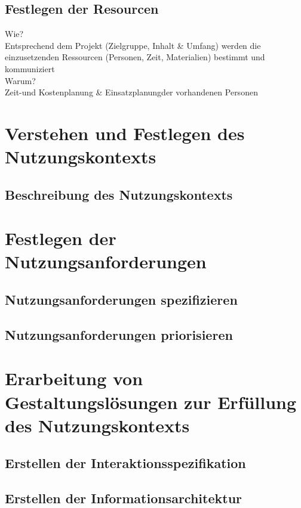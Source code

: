 \documentclass[12pt, a4paper]{scrartcl}
\begin{document}
	\subsection{Festlegen der Resourcen}
	Wie?\\
	Entsprechend dem Projekt (Zielgruppe, Inhalt \& Umfang) werden die einzusetzenden Ressourcen (Personen, Zeit, Materialien) bestimmt und kommuniziert\\
	Warum?\\
	Zeit-und Kostenplanung \& Einsatzplanungder vorhandenen Personen
	
	\newpage
	
	\section{Verstehen und Festlegen des Nutzungskontexts}
	\blindtext[2]
	\subsection{Beschreibung des Nutzungskontexts}
	\blindtext[1]
	
	\newpage
	
	\section{Festlegen der Nutzungsanforderungen}
	\blindtext[2]
	\subsection{Nutzungsanforderungen spezifizieren}
	\blindtext[1]
	\subsection{Nutzungsanforderungen priorisieren}
	\blindtext[1]
	
	\newpage
	
	\section{Erarbeitung von Gestaltungslösungen zur Erfüllung des Nutzungskontexts}
	\blindtext[2]
	\subsection{Erstellen der Interaktionsspezifikation}
	\blindtext[1]
	\subsection{Erstellen der Informationsarchitektur}
	\blindtext[1]
\end{document}
